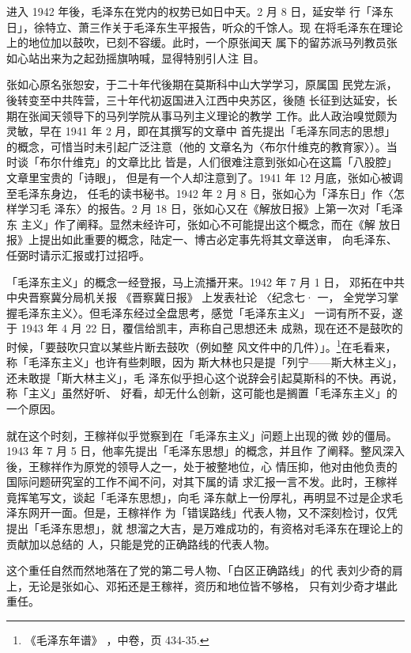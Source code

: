 进入 1942 年後，毛泽东在党内的权势已如日中天。2 月 8 日，延安举
行「泽东日」，徐特立、萧三作关于毛泽东生平报告，听众的千馀人。现
在将毛泽东在理论上的地位加以鼓吹，已刻不容缓。此时，一个原张闻天
属下的留苏派马列教员张如心站出来为之起劲摇旗呐喊，显得特别引人注
目。

张如心原名张恕安，于二十年代後期在莫斯科中山大学学习，原属国
民党左派，後转变至中共阵营，三十年代初返国进入江西中央苏区，後随
长征到达延安，长期在张闻天领导下的马列学院从事马列主义理论的教学
工作。此人政治嗅觉颇为灵敏，早在 1941 年 2 月，即在其撰写的文章中
首先提出「毛泽东同志的思想」的概念，可惜当时未引起广泛注意（他的
文章名为〈布尔什维克的教育家〉）。当时谈「布尔什维克」的文章比比
皆是，人们很难注意到张如心在这篇「八股腔」文章里宝贵的「诗眼」，
但是有一个人却注意到了。1941 年 12 月底，张如心被调至毛泽东身边，
任毛的读书秘书。1942 年 2 月 8 日，张如心为「泽东日」作〈怎样学习毛
泽东〉的报告。2 月 18 日，张如心又在《解放日报》上第一次对「毛泽东
主义」作了阐释。显然未经许可，张如心不可能提出这个概念，而在《解
放日报》上提出如此重要的概念，陆定一、博古必定事先将其文章送审，
向毛泽东、任弼时请示汇报或打过招呼。

「毛泽东主义」的概念一经登报，马上流播开来。1942 年 7 月 1 日，
邓拓在中共中央晋察冀分局机关报
《晋察冀日报》
上发表社论
〈纪念七·
一，
全党学习掌握毛泽东主义〉。但毛泽东经过全盘思考，感觉「毛泽东主义」
一词有所不妥，遂于 1943 年 4 月 22 日，覆信给凯丰，声称自己思想还未
成熟，现在还不是鼓吹的时候，「要鼓吹只宜以某些片断去鼓吹（例如整
风文件中的几件）」。\footnote{《毛泽东年谱》
，中卷，页 434-35.}在毛看来，称「毛泽东主义」也许有些刺眼，因为
斯大林也只是提「列宁——斯大林主义」，还未敢提「斯大林主义」，毛
泽东似乎担心这个说辞会引起莫斯科的不快。再说，称「主义」虽然好听、
好看，却无什么创新，这可能也是搁置「毛泽东主义」的一个原因。

就在这个时刻，王稼祥似乎觉察到在「毛泽东主义」问题上出现的微
妙的僵局。1943 年 7 月 5 日，他率先提出「毛泽东思想」的概念，并且作
了阐释。整风深入後，王稼祥作为原党的领导人之一，处于被整地位，心
情压抑，他对由他负责的国际问题研究室的工作不闻不问，对其下属的请
求汇报一言不发。此时，王稼祥竟挥笔写文，谈起「毛泽东思想」，向毛
泽东献上一份厚礼，再明显不过是企求毛泽东网开一面。但是，王稼祥作
为「错误路线」代表人物，又不深刻检讨，仅凭提出「毛泽东思想」，就
想溜之大吉，是万难成功的，有资格对毛泽东在理论上的贡献加以总结的
人，只能是党的正确路线的代表人物。

这个重任自然而然地落在了党的第二号人物、「白区正确路线」的代
表刘少奇的肩上，无论是张如心、邓拓还是王稼祥，资历和地位皆不够格，
只有刘少奇才堪此重任。
 
